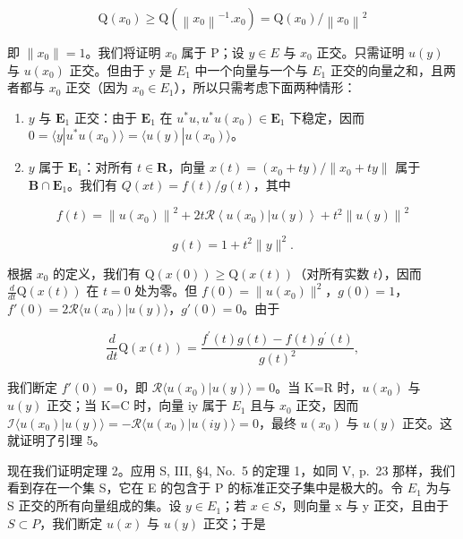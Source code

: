 \[
\mathrm{Q} \left(x _ {0}\right) \geqslant \mathrm{Q} \left(\left\| x _ {0} \right\| ^ {- 1}. x _ {0}\right) = \mathrm{Q} \left(x _ {0}\right) / \left\| x _ {0} \right\| ^ {2}
\]

即 \(\|x_{0}\|=1\)。我们将证明 \(x_{0}\) 属于 P；设 \(y\in E\) 与 \(x_{0}\) 正交。只需证明 \(u(y)\) 与 \(u(x_{0})\) 正交。但由于 y 是 \(E_{1}\) 中一个向量与一个与 \(E_{1}\) 正交的向量之和，且两者都与 \(x_{0}\) 正交（因为 \(x_{0}\in E_{1}\)），所以只需考虑下面两种情形：

\begin{enumerate}
\def\labelenumi{\alph{enumi})}
\item
  \(y\) 与 \(\mathbf{E}_1\) 正交：由于 \(\mathbf{E}_1\) 在 \(u^* u, u^* u(x_0) \in \mathbf{E}_1\) 下稳定，因而 \(0 = \langle y | u^* u(x_0) \rangle = \langle u(y) | u(x_0) \rangle\)。
\item
  \(y\) 属于 \(\mathbf{E}_1\)：对所有 \(t \in \mathbf{R}\)，向量 \(x(t) = (x_0 + ty) / \| x_0 + ty \|\) 属于 \(\mathbf{B} \cap \mathbf{E}_1\)。我们有 \(Q(xt) = f(t) / g(t)\)，其中
\end{enumerate}

\[
f (t) = \left\| u (x _ {0}) \right\| ^ {2} + 2 t \mathscr {R} \left\langle u (x _ {0}) | u (y) \right\rangle + t ^ {2} \left\| u (y) \right\| ^ {2}
\]

\[
g (t) = 1 + t ^ {2} \| y \| ^ {2}.
\]

根据 \(x_0\) 的定义，我们有 \(\mathrm{Q}(x(0)) \geqslant \mathrm{Q}(x(t))\)（对所有实数 \(t\)），因而 \(\frac{d}{dt} \mathrm{Q}(x(t))\) 在 \(t = 0\) 处为零。但 \(f(0) = \| u(x_0)\|^2\)，\(g(0) = 1\)，\(f'(0) = 2\mathcal{R}\langle u(x_0)|u(y)\rangle\)，\(g'(0) = 0\)。由于

\[
\frac {d}{d t} \mathrm{Q} (x (t)) = \frac {f ^ {\prime} (t) g (t) - f (t) g ^ {\prime} (t)}{g (t) ^ {2}},
\]

我们断定 \(f'(0)=0\)，即 \(\mathcal{R}\langle u(x_{0})|u(y)\rangle=0\)。当 K=R 时，\(u(x_{0})\) 与 \(u(y)\) 正交；当 K=C 时，向量 iy 属于 \(E_{1}\) 且与 \(x_{0}\) 正交，因而 \(\mathcal{I}\langle u(x_{0})|u(y)\rangle=-\mathcal{R}\langle u(x_{0})|u(iy)\rangle=0\)，最终 \(u(x_{0})\) 与 \(u(y)\) 正交。这就证明了引理 5。

现在我们证明定理 2。应用 S, III, §4, No.~5 的定理 1，如同 V, p.~23 那样，我们看到存在一个集 S，它在 E 的包含于 P 的标准正交子集中是极大的。令 \(E_{1}\) 为与 S 正交的所有向量组成的集。设 \(y \in E_{1}\)；若 \(x \in S\)，则向量 x 与 y 正交，且由于 \(S \subset P\)，我们断定 \(u(x)\) 与 \(u(y)\) 正交；于是

